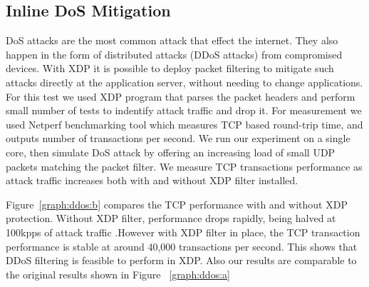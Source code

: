 \documentclass[12pt,titlepage]{article}
\begin{document}
\subsection{Inline DoS Mitigation}

DoS attacks are the most common attack that effect the internet. They also happen in the form of distributed attacks (DDoS attacks) from compromised devices. With XDP it is possible to deploy packet filtering to mitigate such attacks directly at the application server, without needing to change applications. 
For this test we used XDP program that parses the packet headers and perform small number of tests to indentify attack traffic and drop it. For measurement we used Netperf benchmarking tool \cite{netperf} which measures TCP based round-trip time, and outputs number of transactions per second. We run our experiment on a single core, then simulate DoS attack by offering an increasing load of small UDP packets matching the packet filter. We measure TCP transactions performance as attack traffic increases both with and without XDP filter installed.  

Figure~\ref{graph:ddos:b} compares the TCP performance with and without XDP protection. Without XDP filter, performance drops rapidly, being halved at 100kpps of attack traffic .However with XDP filter in place, the TCP transaction performance is stable at around 40,000 transactions per second. This shows that DDoS filtering is feasible to perform in XDP. Also our results are comparable to the original results shown in Figure ~\ref{graph:ddos:a} 
\end{document}
